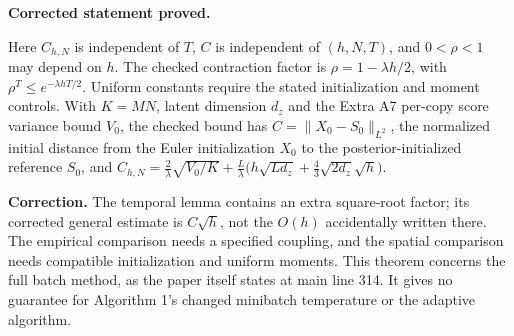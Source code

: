 \documentclass[11pt,a4paper]{report}
\providecommand{\lt}{<}
\begin{document}
\textbf{Corrected statement proved.}



Here \(C_{h,N}\) is independent of \(T\), \(C\) is independent of
        \((h,N,T)\), and \(0\lt\rho\lt1\) may depend on \(h\). The checked
        contraction factor is \(\rho=1-\lambda h/2\), with
        \(\rho^T\le e^{-\lambda hT/2}\). Uniform constants require the stated initialization and
        moment controls. With \(K=MN\), latent dimension \(d_z\) and the Extra A7
        per-copy score variance bound \(V_0\), the checked bound has
        \(C=\|X_0-S_0\|_{L^2}\), the normalized initial distance from the
        Euler initialization \(X_0\) to the posterior-initialized reference
        \(S_0\), and
        \(C_{h,N}=\frac2\lambda\sqrt{V_0/K}+\frac L\lambda\bigl(h\sqrt{Ld_z}+\frac43\sqrt{2d_z}\sqrt h\bigr)\).



\textbf{Correction.} The temporal lemma contains an extra square-root
        factor; its corrected general estimate is \(C\sqrt h\), not the
        \(O(h)\) accidentally written there. The empirical comparison needs a
        specified coupling, and the spatial comparison needs compatible
        initialization and uniform moments. This theorem concerns the full
        batch method, as the paper itself states at main line 314. It gives no
        guarantee for Algorithm 1's changed minibatch temperature or the adaptive
        algorithm.
\end{document}
